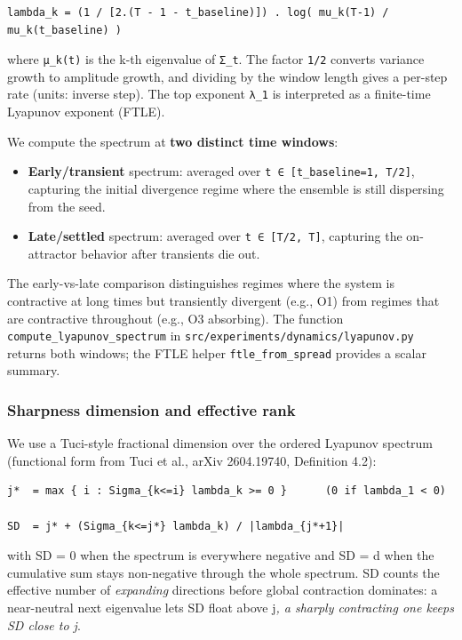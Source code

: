 \documentclass{article}
\theoremstyle{plain}
\theoremstyle{definition}
\begin{document}
\begin{verbatim}
lambda_k = (1 / [2.(T - 1 - t_baseline)]) . log( mu_k(T-1) / mu_k(t_baseline) )
\end{verbatim}

where \texttt{μ\_k(t)} is the k-th eigenvalue of \texttt{Σ\_t}. The factor \texttt{1/2}
converts variance growth to amplitude growth, and dividing by the
window length gives a per-step rate (units: inverse step). The top
exponent \texttt{λ\_1} is interpreted as a finite-time Lyapunov exponent
(FTLE).

We compute the spectrum at \textbf{two distinct time windows}:

\begin{itemize}
  \item \textbf{Early/transient} spectrum: averaged over \texttt{t ∈ [t\_baseline=1, T/2]},
  capturing the initial divergence regime where the ensemble is still
  dispersing from the seed.
  \item \textbf{Late/settled} spectrum: averaged over \texttt{t ∈ [T/2, T]}, capturing
  the on-attractor behavior after transients die out.
\end{itemize}

The early-vs-late comparison distinguishes regimes where the system is
contractive at long times but transiently divergent (e.g., O1) from
regimes that are contractive throughout (e.g., O3 absorbing). The
function \texttt{compute\_lyapunov\_spectrum} in
\texttt{src/experiments/dynamics/lyapunov.py} returns both windows; the FTLE
helper \texttt{ftle\_from\_spread} provides a scalar summary.

\subsubsection{Sharpness dimension and effective rank}

We use a Tuci-style fractional dimension over the ordered Lyapunov
spectrum (functional form from Tuci et al., arXiv 2604.19740,
Definition 4.2):

\begin{verbatim}
j*  = max { i : Sigma_{k<=i} lambda_k >= 0 }      (0 if lambda_1 < 0)

SD  = j* + (Sigma_{k<=j*} lambda_k) / |lambda_{j*+1}|
\end{verbatim}

with SD = 0 when the spectrum is everywhere negative and SD = d when
the cumulative sum stays non-negative through the whole spectrum.
SD counts the effective number of \textit{expanding} directions before global
contraction dominates: a near-neutral next eigenvalue lets SD float
above j\textit{, a sharply contracting one keeps SD close to j}.
\end{document}
